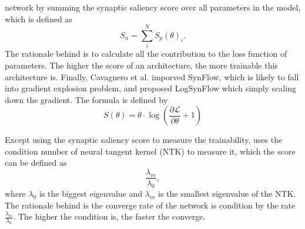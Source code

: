 \documentclass[sigconf]{acmart}
\begin{document}
    network by summing the synaptic saliency score over all parameters in the model, which is 
    defined as 
    \begin{equation}
        \label{equ:zero_cost}
        S_n=\sum^N_i S_p(\theta)_i.
    \end{equation}
    The rationale behind is to calculate all the contribution to the loss function of parameters. 
    The higher the score of an architecture, the more trainable this architecture is. 
    Finally, Cavagnero et al. \cite{Cavagnero_2023} imporved SynFlow, which is likely to fall into 
    gradient explosion problem, and proposed LogSynFlow which simply scaling down the gradient. 
    The formula is defined by 
    \begin{equation}
        \label{equ:logsynflow}
        S(\theta)=\theta\cdot\log(\frac{\partial \mathcal L}{\partial \theta}+1)
    \end{equation}

    Except using the synaptic saliency score to measure the trainability, 
    \cite{https://doi.org/10.48550/arxiv.2102.11535} uses the condition number of neural tangent 
    kernel (NTK) \cite{jacot2020neural} to measure it, which the score can be defined as 
    \begin{equation}
        \label{equ:cn_ntk}
        \frac{\lambda_m}{\lambda_0}, 
    \end{equation}
    where $\lambda_0$ is the biggest eigenvalue and $\lambda_m$ is the smallest eigenvalue of the 
    NTK. The rationale behind is the converge rate of the network is condition by the rate 
    $\frac{\lambda_m}{\lambda_0}$. The higher the condition is, the faster the converge. 
\end{document}
